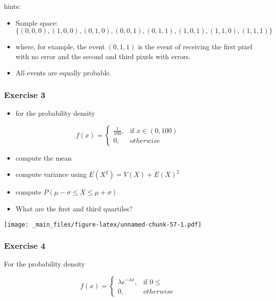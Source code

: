 \documentclass[
]{book}
\providecommand{\tightlist}{%
  \setlength{\itemsep}{0pt}\setlength{\parskip}{0pt}}
\begin{document}
hints:

\begin{itemize}
\item
  Sample space: \(\{(0,0,0), (1,0,0), (0,1,0), (0,0,1), (0,1,1), (1,0,1), (1,1,0), (1,1,1)\}\)
\item
  where, for example, the event \((0,1,1)\) is the event of receiving the first pixel with no error and the second and third pixels with errors.
\item
  All events are equally probable.
\end{itemize}

\hypertarget{exercise-3-1}{%
\subsubsection{Exercise 3}\label{exercise-3-1}}

\begin{itemize}
\tightlist
\item
  for the probability density
\end{itemize}

\[
    f(x)= 
\begin{cases}
    \frac{1}{100},& \text{if } x\in (0,100)\\
    0,& otherwise 
\end{cases}
\]

\begin{itemize}
\tightlist
\item
  compute the mean
\item
  compute variance using \(E(X^2)=V(X)+E(X)^2\)
\item
  compute \(P(\mu-\sigma\leq X \leq \mu+\sigma)\)
\item
  What are the first and third quartiles?
\end{itemize}

\texttt{[image: \_main\_files/figure-latex/unnamed-chunk-57-1.pdf]}

\hypertarget{exercise-4-1}{%
\subsubsection{Exercise 4}\label{exercise-4-1}}

For the probability density

\[
    f(x)= 
\begin{cases}
    \lambda e^{-\lambda x},& \text{if } 0 \leq\\
    0,& otherwise 
\end{cases}
\]
\end{document}
